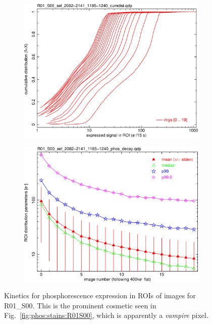 \begin{figure}[!htbp]
\begin{subfigure}{0.45\textwidth}
  \includegraphics[width=\textwidth]{figures/phosphorescence-survey/phos_kinetics/R01_S00_sel_2082-2141_1185-1240_cumdist.png}    
\end{subfigure}
\hfil
\begin{subfigure}{0.45\textwidth}
  \centering
  \includegraphics[width=\textwidth]{figures/phosphorescence-survey/phos_kinetics/R01_S00_sel_2082-2141_1185-1240_phos_decay.png}
\end{subfigure}
\newline
\caption{Kinetics for phosphorescence expression in ROIs of images for R01\_S00. This is the prominent cosmetic seen in Fig.~\ref{fig:phos:stains:R01S00}, which is apparently a {\it vampire} pixel.}
\label{fig:phos:kinetics:R01S00}
\end{figure}

